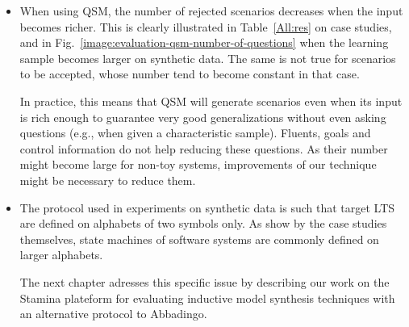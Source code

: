 \begin{itemize}
\item When using QSM, the number of rejected scenarios decreases when the input becomes richer. This is clearly illustrated in Table~\ref{All:res} on case studies, and in Fig.~\ref{image:evaluation-qsm-number-of-questions} when the learning sample becomes larger on synthetic data. The same is not true for scenarios to be accepted, whose number tend to become constant in that case. 

In practice, this means that QSM will generate scenarios even when its input is rich enough to guarantee very good generalizations without even asking questions (e.g., when given a characteristic sample). Fluents, goals and control information do not help reducing these questions. As their number might become large for non-toy systems, improvements of our technique might be necessary to reduce them.

\item The protocol used in experiments on synthetic data is such that target LTS are defined on alphabets of two symbols only. As show by the case studies themselves, state machines of software systems are commonly defined on larger alphabets. 

The next chapter adresses this specific issue by describing our work on the Stamina plateform for evaluating inductive model synthesis techniques with an alternative protocol to Abbadingo.
\end{itemize}
